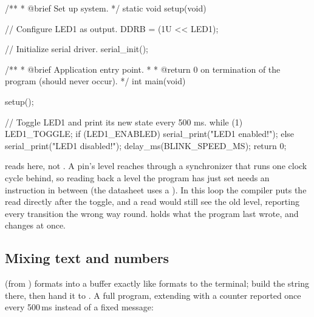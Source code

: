 \begin{ccode}
/**
 * @brief Set up system.
 */
static void setup(void)
{
    // Configure LED1 as output.
    DDRB = (1U << LED1);

    // Initialize serial driver.
    serial_init();
}

/**
 * @brief Application entry point.
 *
 * @return 0 on termination of the program (should never occur).
 */
int main(void)
{
    setup();

    // Toggle LED1 and print its new state every 500 ms.
    while (1)
    {
        LED1_TOGGLE;
        if (LED1_ENABLED) { serial_print("LED1 enabled!"); }
        else { serial_print("LED1 disabled!"); }
        delay_ms(BLINK_SPEED_MS);
    }
    return 0;
}
\end{ccode}

\noindent{} reads  here, not . A pin's level reaches
 through a synchronizer that runs one clock cycle behind, so reading back a level the
program has just set needs an instruction in between (the datasheet uses a ). In this
loop the compiler puts the read directly after the toggle, and a  read would still see
the old level, reporting every transition the wrong way round.  holds what the program
last wrote, and changes at once.

\subsection{Mixing text and numbers}
\label{c6:a:5}
 (from ) formats into a buffer exactly like  formats
to the terminal; build the string there, then hand it to . A full program,
extending  with a counter reported once every 500\,ms instead of a fixed message:

